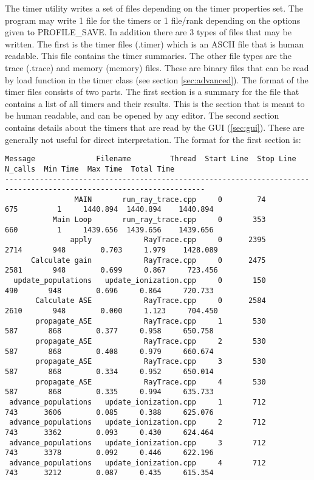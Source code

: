 \documentclass[fleqn,10pt,letterpaper]{article}
\begin{document}
The timer utility writes a set of files depending on the timer properties set.  
The program may write 1 file for the timers or 1 file/rank depending on the 
options given to PROFILE\_SAVE.  In addition there are 3 types of files that 
may be written.  The first is the timer files (.timer) which is an ASCII file
that is human readable.  This file contains the timer summaries.  The other file
types are the trace (.trace) and memory (memory) files.  These are binary files 
that can be read by load function in the timer class (see section \ref{sec:advanced}).  
The format of the timer files consists of two parts.  The first section is
a summary for the file that contains a list of all timers and their results. 
This is the section that is meant to be human readable, and can be opened by any
editor.  The second section contains details about the timers that are read by 
the GUI (\ref{sec:gui}).  These are generally not useful for direct interpretation.
The format for the first section is:

\begin{Verbatim}[fontsize=\footnotesize,baselinestretch=1.0]
        Message              Filename         Thread  Start Line  Stop Line  N_calls  Min Time  Max Time  Total Time
--------------------------------------------------------------------------------------------------------------------
                MAIN       run_ray_trace.cpp     0        74        675         1     1440.894  1440.894    1440.894
           Main Loop       run_ray_trace.cpp     0       353        660         1     1439.656  1439.656    1439.656
               apply            RayTrace.cpp     0      2395       2714       948        0.703     1.979    1428.089
      Calculate gain            RayTrace.cpp     0      2475       2581       948        0.699     0.867     723.456
  update_populations   update_ionization.cpp     0       150        490       948        0.696     0.864     720.733
       Calculate ASE            RayTrace.cpp     0      2584       2610       948        0.000     1.123     704.450
       propagate_ASE            RayTrace.cpp     1       530        587       868        0.377     0.958     650.758
       propagate_ASE            RayTrace.cpp     2       530        587       868        0.408     0.979     660.674
       propagate_ASE            RayTrace.cpp     3       530        587       868        0.334     0.952     650.014
       propagate_ASE            RayTrace.cpp     4       530        587       868        0.335     0.994     635.733
 advance_populations   update_ionization.cpp     1       712        743      3606        0.085     0.388     625.076
 advance_populations   update_ionization.cpp     2       712        743      3362        0.093     0.430     624.464
 advance_populations   update_ionization.cpp     3       712        743      3378        0.092     0.446     622.196
 advance_populations   update_ionization.cpp     4       712        743      3212        0.087     0.435     615.354
\end{Verbatim}
\end{document}
